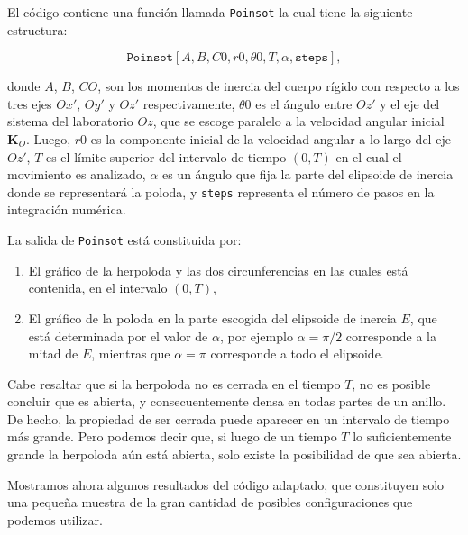 \documentclass[a4paper,10pt]{article}
\numberwithin{equation}{section}
\begin{document}
\vspace{.3cm}

El código contiene una función llamada \texttt{Poinsot} la cual tiene la 
siguiente estructura:

$$
\texttt{Poinsot}[A,B,C0,r0 ,\theta 0,T,\alpha,\texttt{steps}],
$$

donde $A$, $B$, $CO$, son los momentos de inercia del cuerpo rígido con respecto 
a los tres ejes $Ox'$, $Oy'$ y $Oz'$ respectivamente, $\theta 0$ es el ángulo 
entre $Oz'$ y el eje del sistema del laboratorio $Oz$, que se escoge paralelo 
a la velocidad angular inicial $\mathbf{K}_O$. Luego, $r0$ es la componente 
inicial de la velocidad angular a lo largo del eje $Oz'$, $T$ es el límite 
superior del intervalo de tiempo $(0,T)$ en el cual el movimiento es 
analizado, $\alpha$ es un ángulo que fija la parte del elipsoide de 
inercia donde se representará la poloda, y \texttt{steps} representa 
el número de pasos en la integración numérica.

\vspace{.3cm}

La salida de \texttt{Poinsot} está constituida por:

\begin{enumerate}
 \item El gráfico de la herpoloda y las dos circunferencias en las cuales 
 está contenida, en el intervalo $(0,T)$,
 \item El gráfico de la poloda en la parte escogida del elipsoide de 
 inercia $E$, que está determinada por el valor de $\alpha$, por ejemplo 
 $\alpha = \pi/2$ corresponde a la mitad de $E$, mientras que $\alpha=\pi$
 corresponde a todo el elipsoide.
\end{enumerate}

Cabe resaltar que si la herpoloda no es cerrada en el tiempo $T$, no 
es posible concluir que es abierta, y consecuentemente densa en todas 
partes de un anillo. De hecho, la propiedad de ser cerrada puede aparecer 
en un intervalo de tiempo más grande. Pero podemos decir que, si luego 
de un tiempo $T$ lo suficientemente grande la herpoloda aún está abierta,
solo existe la posibilidad de que sea abierta.

\vspace{.3cm}

Mostramos ahora algunos resultados del código adaptado, que constituyen solo
una pequeña muestra de la gran cantidad de posibles configuraciones que 
podemos utilizar.

\vspace{.3cm}
\end{document}
